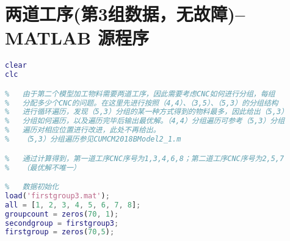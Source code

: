 \documentclass[no-math,withoutpreface,bwprint]{cumcmthesis} %
\numberwithin{equation}{section}
\numberwithin{figure}{section}
\numberwithin{table}{section}
\begin{document}
\section{ 两道工序(第3组数据，无故障)--MATLAB 源程序}
\begin{lstlisting}[language=matlab]
%   MATLAB初始化
clear
clc

%   由于第二个模型加工物料需要两道工序，因此需要考虑CNC如何进行分组，每组
%   分配多少个CNC的问题。在这里先进行按照（4,4）、（3,5）、（5,3）的分组结构
%   进行循环遍历，发现（5,3）分组的某一种方式得到的物料最多，因此给出（5,3）
%   分组如何遍历，以及遍历完毕后输出最优解。（4,4）分组遍历可参考（5,3）分组
%   遍历对相应位置进行改进，此处不再给出。
%   （5,3）分组遍历参见CUMCM2018BModel2_1.m

%   通过计算得到，第一道工序CNC序号为1,3,4,6,8；第二道工序CNC序号为2,5,7
%   （最优解不唯一）

%   数据初始化
load('firstgroup3.mat');
all = [1, 2, 3, 4, 5, 6, 7, 8];
groupcount = zeros(70, 1);
secondgroup = firstgroup3;
firstgroup = zeros(70,5);


\end{lstlisting}
\end{document}
